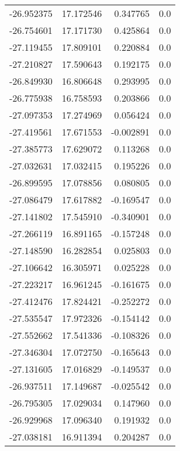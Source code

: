 \begin{tabular}{rrrr}
      -26.952375 &        17.172546 &    0.347765 &   0.0 \\
      -26.754601 &        17.171730 &    0.425864 &   0.0 \\
      -27.119455 &        17.809101 &    0.220884 &   0.0 \\
      -27.210827 &        17.590643 &    0.192175 &   0.0 \\
      -26.849930 &        16.806648 &    0.293995 &   0.0 \\
      -26.775938 &        16.758593 &    0.203866 &   0.0 \\
      -27.097353 &        17.274969 &    0.056424 &   0.0 \\
      -27.419561 &        17.671553 &   -0.002891 &   0.0 \\
      -27.385773 &        17.629072 &    0.113268 &   0.0 \\
      -27.032631 &        17.032415 &    0.195226 &   0.0 \\
      -26.899595 &        17.078856 &    0.080805 &   0.0 \\
      -27.086479 &        17.617882 &   -0.169547 &   0.0 \\
      -27.141802 &        17.545910 &   -0.340901 &   0.0 \\
      -27.266119 &        16.891165 &   -0.157248 &   0.0 \\
      -27.148590 &        16.282854 &    0.025803 &   0.0 \\
      -27.106642 &        16.305971 &    0.025228 &   0.0 \\
      -27.223217 &        16.961245 &   -0.161675 &   0.0 \\
      -27.412476 &        17.824421 &   -0.252272 &   0.0 \\
      -27.535547 &        17.972326 &   -0.154142 &   0.0 \\
      -27.552662 &        17.541336 &   -0.108326 &   0.0 \\
      -27.346304 &        17.072750 &   -0.165643 &   0.0 \\
      -27.131605 &        17.016829 &   -0.149537 &   0.0 \\
      -26.937511 &        17.149687 &   -0.025542 &   0.0 \\
      -26.795305 &        17.029034 &    0.147960 &   0.0 \\
      -26.929968 &        17.096340 &    0.191932 &   0.0 \\
      -27.038181 &        16.911394 &    0.204287 &   0.0 \\

\end{tabular}
